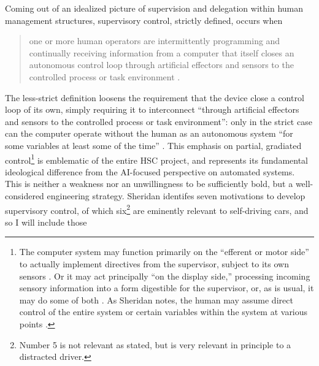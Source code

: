 
Coming out of an idealized picture of supervision and delegation
within human management structures, supervisory control, strictly defined, occurs when
\begin{quote}one or more human operators are intermittently
  programming and continually receiving information from a computer
  that itself closes an autonomous control loop through artificial
  effectors and sensors to the controlled process or task
  environment \cite[p. 1]{sheridan}.\end{quote}
The less-strict definition loosens the requirement that the device
close a control loop of its own, simply requiring it to interconnect
``through artificial effectors and sensors to the controlled process
or task environment'':  only in the strict case can the computer
operate without the human as an autonomous system ``for some
variables at least some of the time'' \cite[p. 1]{sheridan}. This
emphasis on partial, gradiated control\footnote{The computer system
  may function primarily on the ``efferent or motor side'' to actually
implement directives from the supervisor, subject to its own
sensors \cite[p. 3]{sheridan}. Or it may act principally ``on the
display side,'' processing incoming sensory information into a form
digestible for the supervisor, or, as is usual, it may do some of
both \cite[p. 3]{sheridan}. As Sheridan notes, the human
may assume direct control of the entire system or certain variables
within the system at various points \cite[p. 3]{sheridan}.} is
emblematic of the entire HSC 
project, and represents its fundamental ideological difference from
the AI-focused perspective on automated systems. This is neither a
weakness nor an unwillingness to be sufficiently bold, but a
well-considered engineering strategy. Sheridan identifes seven
motivations to develop supervisory control, of which
six\footnote{Number 5 is not relevant as stated, but is very relevant
  in principle to a distracted driver.} are
eminently relevant to self-driving cars, and so I will include those
